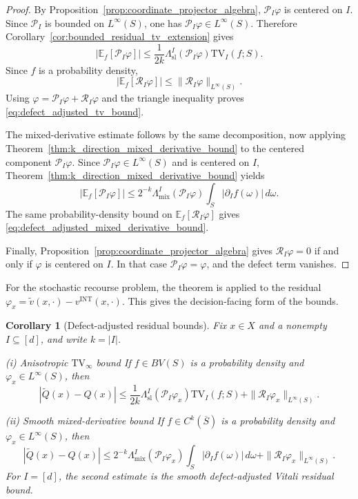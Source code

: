 \documentclass[11pt,letterpaper]{article}
\newtheorem{corollary}[theorem]{Corollary}
\theoremstyle{definition}
\theoremstyle{remark}
\newcommand{\INT}{\mathrm{INT}}
\newcommand{\TV}{\mathrm{TV}}
\begin{document}
\begin{proof}
By Proposition~\ref{prop:coordinate_projector_algebra},
$\mathcal P_I\varphi$ is centered on $I$. Since $\mathcal P_I$ is bounded on
$L^\infty(S)$, one has
$\mathcal P_I\varphi\in L^\infty(S)$. Therefore
Corollary~\ref{cor:bounded_residual_tv_extension} gives
$$
|\mathbb E_f[\mathcal P_I\varphi]|
\le
\frac{1}{2k}
\Lambda_{\mathrm{sl}}^I(\mathcal P_I\varphi)
\TV_I(f;S).
$$
Since $f$ is a probability density,
$$
|\mathbb E_f[\mathcal R_I\varphi]|
\le
\|\mathcal R_I\varphi\|_{L^\infty(S)}.
$$
Using $\varphi=\mathcal P_I\varphi+\mathcal R_I\varphi$ and the triangle
inequality proves \eqref{eq:defect_adjusted_tv_bound}.

The mixed-derivative estimate follows by the same decomposition, now applying
Theorem~\ref{thm:k_direction_mixed_derivative_bound} to the centered component
$\mathcal P_I\varphi$. Since
$\mathcal P_I\varphi\in L^\infty(S)$ and is centered on $I$,
Theorem~\ref{thm:k_direction_mixed_derivative_bound} yields
$$
|\mathbb E_f[\mathcal P_I\varphi]|
\le
2^{-k}
\Lambda_{\mathrm{mix}}^I(\mathcal P_I\varphi)
\int_S|\partial_I f(\omega)|\,d\omega.
$$
The same probability-density bound on
$\mathbb E_f[\mathcal R_I\varphi]$ gives
\eqref{eq:defect_adjusted_mixed_derivative_bound}.

Finally, Proposition~\ref{prop:coordinate_projector_algebra} gives
$\mathcal R_I\varphi=0$ if and only if $\varphi$ is centered on $I$. In that
case $\mathcal P_I\varphi=\varphi$, and the defect term vanishes.
\end{proof}

For the stochastic recourse problem, the theorem is applied to the residual
$\varphi_x=\widetilde v(x,\cdot)-v^{\INT}(x,\cdot)$. This gives the
decision-facing form of the bounds.

\begin{corollary}[Defect-adjusted residual bounds]
\label{cor:defect_adjusted_recourse_residual}
Fix $x\in X$ and a nonempty $I\subseteq[d]$, and write $k=|I|$.

\emph{(i) Anisotropic $\TV_\infty$ bound } 
If $f\in BV(S)$ is a probability density and
$\varphi_x\in L^\infty(S)$, then
\begin{equation}
\label{eq:defect_adjusted_recourse_tv}
|\widetilde Q(x)-Q(x)|
\le
\frac{1}{2k}
\Lambda_{\mathrm{sl}}^I(\mathcal P_I\varphi_x)
\TV_I(f;S)
+
\|\mathcal R_I\varphi_x\|_{L^\infty(S)}.
\end{equation}

\emph{(ii) Smooth mixed-derivative bound } 
If $f\in C^k(\overline S)$ is a probability density and
$\varphi_x\in L^\infty(S)$, then
\begin{equation}
\label{eq:defect_adjusted_recourse_mixed_derivative}
|\widetilde Q(x)-Q(x)|
\le
2^{-k}
\Lambda_{\mathrm{mix}}^I(\mathcal P_I\varphi_x)
\int_S|\partial_I f(\omega)|\,d\omega
+
\|\mathcal R_I\varphi_x\|_{L^\infty(S)}.
\end{equation}
For $I=[d]$, the second estimate is the smooth defect-adjusted Vitali residual
bound.
\end{corollary}
\end{document}
